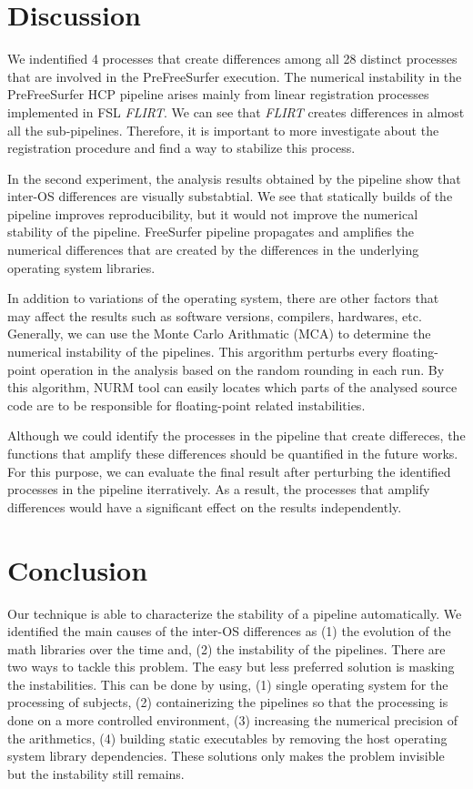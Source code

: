 \documentclass[a4paper,num-refs]{oup-contemporary}
\begin{document}
{\section{Discussion}

We indentified 4 processes that create differences 
among all 28 distinct processes that are involved in the PreFreeSurfer execution. 
The numerical instability in the 
PreFreeSurfer HCP pipeline arises mainly from linear 
registration processes implemented in FSL \emph{FLIRT}. 
We can see that \emph{FLIRT} creates differences in almost all the sub-pipelines. 
Therefore, it is important to more investigate about the registration procedure and find 
a way to stabilize this process. 

In the second experiment, 
the analysis results obtained by the pipeline show that inter-OS differences are visually substabtial.
We see that statically builds of the pipeline improves reproducibility, but 
it would not improve the numerical stability of the pipeline. 
FreeSurfer pipeline propagates and amplifies the numerical differences that are created by the 
differences in the underlying operating system libraries.

In addition to variations of the operating system, there are other factors that may affect 
the results such as software versions, compilers, hardwares, etc.
Generally, we can use the Monte Carlo Arithmatic (MCA) to determine the numerical instability of the pipelines.
This argorithm perturbs every floating-point operation 
in the analysis based on the random rounding in each run. 
By this algorithm, NURM tool can easily locates which parts of the analysed source code are to be responsible 
for floating-point related instabilities.

Although we could identify the processes in the pipeline that create differeces, the functions 
that amplify these differences should be quantified in the future works.
For this purpose, we can evaluate the final result after perturbing the identified processes in the pipeline iterratively.
As a result, the processes that amplify differences would have a significant effect on the results independently.


\section{Conclusion}

Our technique is able to characterize the stability of a pipeline
automatically. We identified the main causes of the inter-OS differences as (1) the evolution 
of the math libraries over the time and, (2) the instability of the pipelines. 
There are two ways to tackle this problem. The easy but less preferred solution is masking the instabilities.
This can be done by using, (1) single operating system for the processing of subjects, 
(2) containerizing the pipelines so that the 
processing is done on a more controlled environment, 
(3) increasing the numerical precision of the arithmetics, 
(4) building static executables by removing the host operating system library dependencies. 
These solutions only makes the problem invisible but the instability still remains.

}
\end{document}

